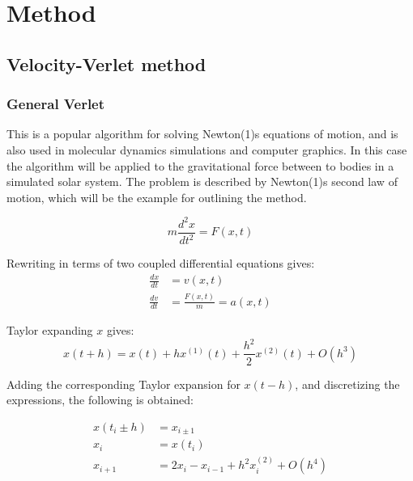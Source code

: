 \section{Method}

\subsection{Velocity-Verlet method}
\subsubsection{General Verlet}
This is a popular algorithm for solving Newton{(1)}s equations of motion, and is also used in 
molecular dynamics simulations and computer graphics. In this case the algorithm will be 
applied to the gravitational force between to bodies in a simulated solar system. 
The problem is described by Newton{(1)}s second law of motion, which will be the example for outlining
the method.

\begin{equation*}
m\frac{d^2x}{dt^2}= F(x,t)
\end{equation*}

Rewriting in terms of two coupled differential equations gives:
\begin{align*}
\frac{dx}{dt} &= v(x,t) \\
\frac{dv}{dt} &= \frac{F(x,t)}{m} = a(x,t)
\end{align*}


Taylor expanding $x$ gives:
\begin{equation*}
x(t+h) = x(t) + hx^{(1)}(t) + \frac{h^2}{2}x^{{(2)}}(t) + O(h^3)
\end{equation*}

Adding the corresponding Taylor expansion for $x(t-h)$, and discretizing the expressions,
the following is obtained:

\begin{align*}
x(t_i \pm h) &= x_{i\pm 1} \\
x_i &= x(t_i) \\
x_{i+1} &= 2x_i - x_{i-1} + h^2 x_i^{{(2)}} + O(h^4)
\end{align*}

